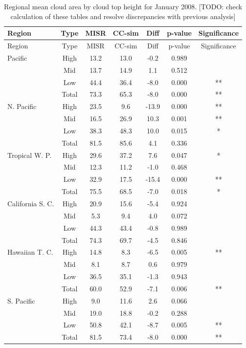 \begin{longtable}[]{@{}lcccccc@{}}
\caption{\label{tbl:misr_cldmisr_table_january}Regional mean cloud area
by cloud top height for January 2008. {[}TODO: check calculation of
these tables and resolve discrepancies with previous analysis{]}
}\tabularnewline
\toprule
Region & Type & MISR & CC-sim & Diff & p-value &
Significance\tabularnewline
\midrule
\endfirsthead
\toprule
Region & Type & MISR & CC-sim & Diff & p-value &
Significance\tabularnewline
\midrule
\endhead
Pacific & High & 13.2 & 13.0 & -0.2 & 0.989 &\tabularnewline
& Mid & 13.7 & 14.9 & 1.1 & 0.512 &\tabularnewline
& Low & 44.4 & 36.4 & -8.0 & 0.000 & **\tabularnewline
& Total & 73.3 & 65.3 & -8.0 & 0.000 & **\tabularnewline
N. Pacific & High & 23.5 & 9.6 & -13.9 & 0.000 & **\tabularnewline
& Mid & 16.5 & 26.9 & 10.3 & 0.001 & **\tabularnewline
& Low & 38.3 & 48.3 & 10.0 & 0.015 & *\tabularnewline
& Total & 81.5 & 85.6 & 4.1 & 0.336 &\tabularnewline
Tropical W. P. & High & 29.6 & 37.2 & 7.6 & 0.047 & *\tabularnewline
& Mid & 12.3 & 11.2 & -1.0 & 0.468 &\tabularnewline
& Low & 32.9 & 17.5 & -15.4 & 0.000 & **\tabularnewline
& Total & 75.5 & 68.5 & -7.0 & 0.018 & *\tabularnewline
California S. C. & High & 20.9 & 15.6 & -5.4 & 0.924 &\tabularnewline
& Mid & 5.3 & 9.4 & 4.0 & 0.072 &\tabularnewline
& Low & 44.3 & 43.4 & -0.8 & 0.989 &\tabularnewline
& Total & 74.3 & 69.7 & -4.5 & 0.846 &\tabularnewline
Hawaiian T. C. & High & 14.8 & 8.3 & -6.5 & 0.005 & **\tabularnewline
& Mid & 8.1 & 8.7 & 0.6 & 0.979 &\tabularnewline
& Low & 36.5 & 35.1 & -1.3 & 0.943 &\tabularnewline
& Total & 60.0 & 52.9 & -7.1 & 0.006 & **\tabularnewline
S. Pacific & High & 9.0 & 11.6 & 2.6 & 0.066 &\tabularnewline
& Mid & 19.0 & 18.8 & -0.2 & 0.288 &\tabularnewline
& Low & 50.8 & 42.1 & -8.7 & 0.005 & **\tabularnewline
& Total & 81.5 & 73.4 & -8.0 & 0.000 & **\tabularnewline
\bottomrule
\end{longtable}


